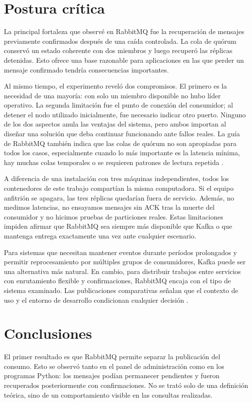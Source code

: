 \documentclass[12pt,a4paper]{article}
\begin{document}
\section{Postura crítica}
La principal fortaleza que observé en RabbitMQ fue la recuperación de mensajes previamente confirmados después de una caída controlada. La cola de quórum conservó un estado coherente con dos miembros y luego recuperó las réplicas detenidas. Esto ofrece una base razonable para aplicaciones en las que perder un mensaje confirmado tendría consecuencias importantes.

Al mismo tiempo, el experimento reveló dos compromisos. El primero es la necesidad de una mayoría: con solo un miembro disponible no hubo líder operativo. La segunda limitación fue el punto de conexión del consumidor; al detener el nodo utilizado inicialmente, fue necesario indicar otro puerto. Ninguno de los dos aspectos anula las ventajas del sistema, pero ambos importan al diseñar una solución que deba continuar funcionando ante fallos reales. La guía de RabbitMQ también indica que las colas de quórum no son apropiadas para todos los casos, especialmente cuando lo más importante es la latencia mínima, hay muchas colas temporales o se requieren patrones de lectura repetida \cite{RabbitMQQuorum2026}.

A diferencia de una instalación con tres máquinas independientes, todos los contenedores de este trabajo compartían la misma computadora. Si el equipo anfitrión se apagara, las tres réplicas quedarían fuera de servicio. Además, no medimos latencias, no ensayamos mensajes sin ACK tras la muerte del consumidor y no hicimos pruebas de particiones reales. Estas limitaciones impiden afirmar que RabbitMQ sea siempre más disponible que Kafka o que mantenga entrega exactamente una vez ante cualquier escenario.

Para sistemas que necesitan mantener eventos durante períodos prolongados y permitir reprocesamiento por múltiples grupos de consumidores, Kafka puede ser una alternativa más natural. En cambio, para distribuir trabajos entre servicios con enrutamiento flexible y confirmaciones, RabbitMQ encaja con el tipo de sistema examinado. Las publicaciones comparativas señalan que el contexto de uso y el entorno de desarrollo condicionan cualquier decisión \cite{Maharjan2023,Kaminski2025}.

\section{Conclusiones}
El primer resultado es que RabbitMQ permite separar la publicación del consumo. Esto se observó tanto en el panel de administración como en los programas Python: los mensajes podían permanecer pendientes y fueron recuperados posteriormente con confirmaciones. No se trató solo de una definición teórica, sino de un comportamiento visible en las consultas realizadas.
\end{document}
